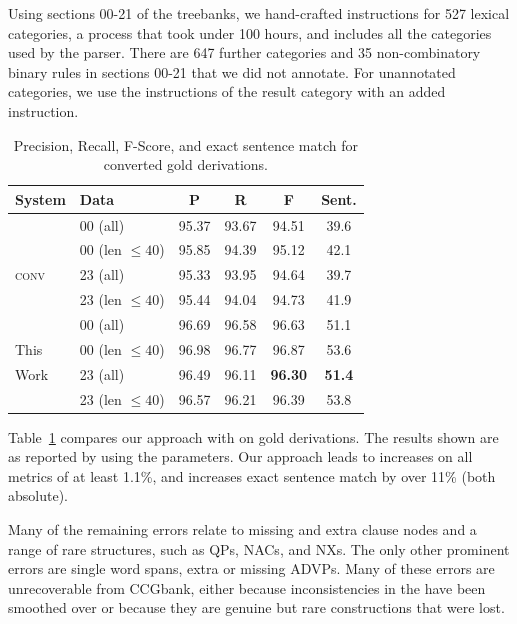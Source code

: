 Using sections 00-21 of the treebanks, we hand-crafted instructions for 527
lexical categories, a process that took under 100 hours, and includes all the
categories used by the \candc parser.  There are 647 further categories and 35
non-combinatory binary rules in sections 00-21 that we did not annotate.  For
unannotated categories, we use the instructions of the result category with an
added instruction.

\begin{table}
\renewcommand{\tabcolsep}{1.65mm}
\small
\begin{center}
\begin{tabular}{llcccc}
	\hline
		System & Data & P & R & F & Sent. \\
	\hline
	\hline
		 & 00 (all) & 95.37 & 93.67 & 94.51 & 39.6 \\
		\candc & 00 (len $\le 40$) & 95.85 & 94.39 & 95.12 & 42.1 \\
		\textsc{conv} & 23 (all) & 95.33 & 93.95 & 94.64 & 39.7 \\
		 & 23 (len $\le 40$) & 95.44 & 94.04 & 94.73 & 41.9 \\
	\hline
		 & 00 (all) & 96.69 & 96.58 & 96.63 & 51.1 \\
		This & 00 (len $\le 40$) & 96.98 & 96.77 & 96.87 & 53.6 \\
		Work & 23 (all) & 96.49 & 96.11 & \textbf{96.30} & \textbf{51.4} \\
		 & 23 (len $\le 40$) & 96.57 & 96.21 & 96.39 & 53.8 \\
	\hline
\end{tabular}
\end{center}
\vspace{-4.5mm}
\caption{\label{tab:conversion-comparison}
	\parseval Precision, Recall, F-Score, and exact sentence match for converted
	gold \ccg derivations.
}
\vspace{-5mm}
\end{table}

Table~\ref{tab:conversion-comparison} compares our approach
with \old on gold \ccg derivations.  The results shown are 
as reported by \evalb
\parencite{Black-etal:1991} using the \textcite{Collins:1997} parameters.
Our approach leads to increases on all metrics of at least 1.1\%, and
increases exact sentence match by over 11\% (both absolute).

Many of the remaining errors relate to missing and extra clause nodes and a
range of rare structures, such as QPs, NACs, and NXs. The only other prominent
errors are single word spans, \myeg extra or missing ADVPs.  Many of these errors
are unrecoverable from CCGbank, either because inconsistencies in the \ptb have
been smoothed over or because they are genuine but rare constructions that
were lost.

